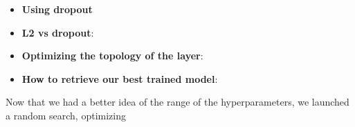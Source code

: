 \begin{itemize}[topsep=-13pt]
\item \textbf{Using dropout}\\


\item \textbf{L2 vs dropout}:\\

\item \textbf{Optimizing the topology of the layer}:\\  
  
\item \textbf{How to retrieve our best trained model}:\\
\end{itemize}
  



Now that we had a better idea of the range of the hyperparameters, we launched a random search, optimizing
